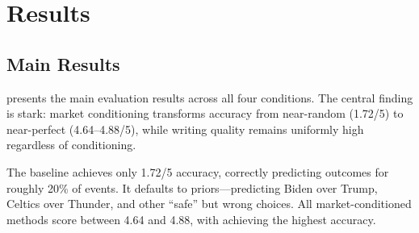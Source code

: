 \section{Results}
\label{sec:results}

\subsection{Main Results}
\label{sec:main_results}

 presents the main evaluation results across all four conditions. The central finding is stark: market conditioning transforms accuracy from near-random (1.72/5) to near-perfect (4.64--4.88/5), while writing quality remains uniformly high regardless of conditioning.

\begin{table}[t]
\centering
\caption{Article quality scores (mean $\pm$ std) across four generation conditions, evaluated over 25 resolved \polymarket events. Best results per metric are \textbf{bolded}. All market-conditioned methods dramatically outperform \nomarket on accuracy and semantic similarity.}
\label{tab:main}
\small
{}
\end{table}

 The \nomarket baseline achieves only 1.72/5 accuracy, correctly predicting outcomes for roughly 20\% of events. It defaults to priors---predicting Biden over Trump, Celtics over Thunder, and other ``safe'' but wrong choices. All market-conditioned methods score between 4.64 and 4.88, with \directmarket achieving the highest accuracy.

